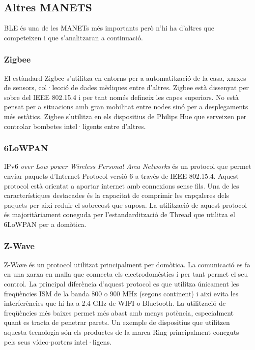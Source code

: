 \subsection{Altres MANETS}
BLE és una de les MANETs més importants però n'hi ha d'altres que competeixen i que s'analitzaran a continuació.

\subsubsection{Zigbee}
El estàndard Zigbee s'utilitza en entorns per a automatització de la casa, xarxes de sensors, col·lecció de dades mèdiques entre d'altres.
Zigbee està dissenyat per sobre del IEEE 802.15.4 i per tant només defineix les capes superiors.
No està pensat per a situacions amb gran mobilitat entre nodes sinó per a desplegaments més estàtics.
Zigbee s'utilitza en els dispositius de Philips Hue que serveixen per controlar bombetes intel·ligents entre d'altres.

\subsubsection{6LoWPAN}
IPv6 \textit{over Low power Wireless Personal Area Networks} és un protocol que permet enviar paquets d'Internet Protocol versió 6 a través de IEEE 802.15.4.
Aquest protocol està orientat a aportar internet amb connexions sense fils.
Una de les característiques destacades és la capacitat de comprimir les capçaleres dels paquets per així reduir el sobrecost que suposa.
La utilització de aquest protocol és majoritàriament coneguda per l'estandardització de Thread que utilitza el 6LoWPAN per a domòtica.

\subsubsection{Z-Wave}
Z-Wave és un protocol utilitzat principalment per domòtica. La comunicació es fa en una xarxa en malla que connecta els electrodomèstics i per tant permet el seu control.
La principal diferència d'aquest protocol es que utilitza únicament les freqüències ISM de la banda 800 o 900 MHz (segons continent) i així evita les interferències que hi ha a 2.4 GHz de WIFI o Bluetooth.
La utilització de freqüències més baixes permet més abast amb menys potència, especialment quant es tracta de penetrar parets.
Un exemple de dispositius que utilitzen aquesta tecnologia són els productes de la marca Ring principalment coneguts pels seus vídeo-porters intel·ligens.

